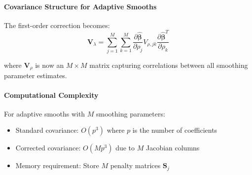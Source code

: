 \documentclass[12pt]{article}
\begin{document}
\paragraph{Covariance Structure for Adaptive Smooths}
The first-order correction becomes:
\begin{equation}
\mathbf{V}_\lambda = \sum_{j=1}^M \sum_{k=1}^M \frac{\partial\hat{\boldsymbol{\beta}}}{\partial\rho_j} V_{\rho,jk} \frac{\partial\hat{\boldsymbol{\beta}}^T}{\partial\rho_k}
\end{equation}

where $\mathbf{V}_\rho$ is now an $M \times M$ matrix capturing correlations between all smoothing parameter estimates.

\paragraph{Computational Complexity}
For adaptive smooths with $M$ smoothing parameters:
\begin{itemize}
    \item Standard covariance: $O(p^3)$ where $p$ is the number of coefficients
    \item Corrected covariance: $O(Mp^3)$ due to $M$ Jacobian columns
    \item Memory requirement: Store $M$ penalty matrices $\mathbf{S}_j$
\end{itemize}
\end{document}
